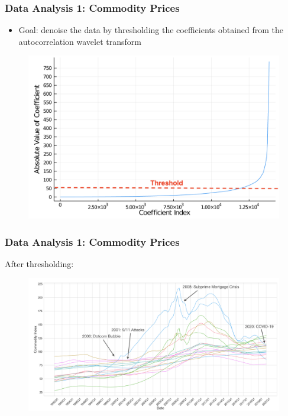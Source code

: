 \documentclass[aspectratio=169]{beamer}
\begin{document}
\begin{frame}
\frametitle{Data Analysis 1: Commodity Prices}
\begin{itemize}
    \item Goal: denoise the data by thresholding the coefficients obtained from the autocorrelation wavelet transform
\end{itemize}
\begin{figure}
    \centering
    \includegraphics[scale=0.45]{comm_coef_thresh.png}
\end{figure}
\end{frame}

\begin{frame}
\frametitle{Data Analysis 1: Commodity Prices}
After thresholding:
\begin{figure}
    \centering
    \includegraphics[scale=0.4]{comm_thresh.png}
\end{figure}
\end{frame}

\end{document}
